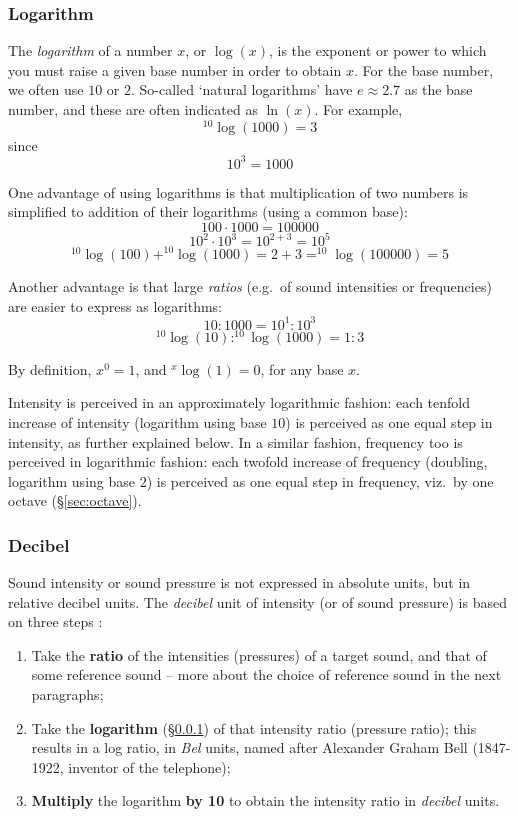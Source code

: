 \documentclass[
]{book}
\begin{document}
\subsubsection{Logarithm}\label{sec:logarithm}

The \emph{logarithm} of a number \(x\), or \(\log(x)\), is the exponent or power to which you must raise a given base number in order to obtain \(x\). For the base number, we often use \(10\) or \(2\). So-called `natural logarithms' have \(e \approx 2.7\) as the base number, and these are often indicated as \(\ln(x)\). For example,
\[^{10}\log(1000)=3\]
since \[10^3=1000\]

One advantage of using logarithms is that multiplication of two numbers is simplified to addition of their logarithms (using a common base):
\[100 \cdot 1000 = 100000\]
\[10^2 \cdot 10^3 = 10^{2+3} = 10^5\]
\[^{10}\log(100) + ^{10}\log(1000) =2+3= ^{10}\log(100000) =5\]

Another advantage is that large \emph{ratios} (e.g.~of sound intensities or frequencies) are easier to express as logarithms:
\[10 : 1000 = 10^1 : 10^3\]
\[^{10}\log(10) : ^{10}\log(1000) = 1 : 3\]

\label{log1}
By definition, \(x^0=1\), and \(^x\log(1)=0\), for any base \(x\).

Intensity is perceived in an approximately logarithmic fashion: each tenfold increase of intensity (logarithm using base \(10\)) is perceived as one equal step in intensity, as further explained below. In a similar fashion, frequency too is perceived in logarithmic fashion: each twofold increase of frequency (doubling, logarithm using base \(2\)) is perceived as one equal step in frequency, viz.~by one octave (§\ref{sec:octave}).

\subsubsection{Decibel}\label{sec:decibel}

Sound intensity or sound pressure is not expressed in absolute units, but in relative decibel units. The \emph{decibel} unit of intensity (or of sound pressure) is based on three steps \citep[91ff]{Fry_1979}:

\begin{enumerate}
\def\labelenumi{\arabic{enumi}.}
\item
  Take the \textbf{ratio} of the intensities (pressures) of a target sound, and that of some reference sound -- more about the choice of reference sound in the next paragraphs;
\item
  Take the \textbf{logarithm} (§\ref{sec:logarithm}) of that intensity ratio (pressure ratio); this results in a log ratio, in \emph{Bel} units, named after Alexander Graham Bell (1847-1922, inventor of the telephone);
\item
  \textbf{Multiply} the logarithm \textbf{by 10} to obtain the intensity ratio in \emph{decibel} units.
\end{enumerate}
\end{document}
